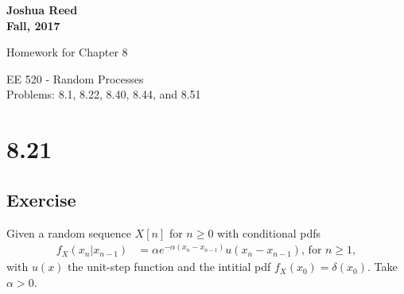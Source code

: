 \documentclass[12pt]{article}
\begin{document}
{%
  \large \bfseries 
  Joshua Reed\\
  Fall, 2017

  \begin{center}
    {\huge Homework for Chapter 8}

    EE 520 - Random Processes \\%
  \normalsize Problems: 8.1, 8.22, 8.40, 8.44, and 8.51
  \end{center}}
 
 
\section{8.21} 
\subsection{Exercise}
Given a random sequence $X[n]$ for $n \geq0$ with conditional pdfs
\begin{align*}
  f_X(x_n|x_{n-1})&=\alpha e^{-\alpha(x_n-x_{n-1})}u(x_n-x_{n-1})\text{,  for } n\geq 1,
\end{align*}
with $u(x)$ the unit-step function and the intitial pdf $f_X(x_0)=\delta(x_0)$. Take $\alpha > 0$.
\end{document}
